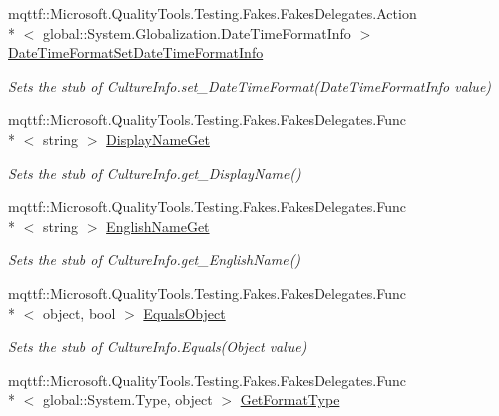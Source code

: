 \begin{DoxyCompactItemize}
mqttf\-::\-Microsoft.\-Quality\-Tools.\-Testing.\-Fakes.\-Fakes\-Delegates.\-Action\\*
$<$ global\-::\-System.\-Globalization.\-Date\-Time\-Format\-Info $>$ \hyperlink{class_system_1_1_globalization_1_1_fakes_1_1_stub_culture_info_a1e408ad11285f333094ebf5a964f8446}{Date\-Time\-Format\-Set\-Date\-Time\-Format\-Info}
\begin{DoxyCompactList}\small\item\em Sets the stub of Culture\-Info.\-set\-\_\-\-Date\-Time\-Format(\-Date\-Time\-Format\-Info value)\end{DoxyCompactList}\item 
mqttf\-::\-Microsoft.\-Quality\-Tools.\-Testing.\-Fakes.\-Fakes\-Delegates.\-Func\\*
$<$ string $>$ \hyperlink{class_system_1_1_globalization_1_1_fakes_1_1_stub_culture_info_aa9d92f3a96d638b2297b6e25c240a06e}{Display\-Name\-Get}
\begin{DoxyCompactList}\small\item\em Sets the stub of Culture\-Info.\-get\-\_\-\-Display\-Name()\end{DoxyCompactList}\item 
mqttf\-::\-Microsoft.\-Quality\-Tools.\-Testing.\-Fakes.\-Fakes\-Delegates.\-Func\\*
$<$ string $>$ \hyperlink{class_system_1_1_globalization_1_1_fakes_1_1_stub_culture_info_a3707915d0bf0201a284266bde13562cf}{English\-Name\-Get}
\begin{DoxyCompactList}\small\item\em Sets the stub of Culture\-Info.\-get\-\_\-\-English\-Name()\end{DoxyCompactList}\item 
mqttf\-::\-Microsoft.\-Quality\-Tools.\-Testing.\-Fakes.\-Fakes\-Delegates.\-Func\\*
$<$ object, bool $>$ \hyperlink{class_system_1_1_globalization_1_1_fakes_1_1_stub_culture_info_aa7af9e2f412d13a6eda018a61a46a2fa}{Equals\-Object}
\begin{DoxyCompactList}\small\item\em Sets the stub of Culture\-Info.\-Equals(\-Object value)\end{DoxyCompactList}\item 
mqttf\-::\-Microsoft.\-Quality\-Tools.\-Testing.\-Fakes.\-Fakes\-Delegates.\-Func\\*
$<$ global\-::\-System.\-Type, object $>$ \hyperlink{class_system_1_1_globalization_1_1_fakes_1_1_stub_culture_info_a6727b035f13af90bbd3eacec9b1112a5}{Get\-Format\-Type}

\end{DoxyCompactItemize}
